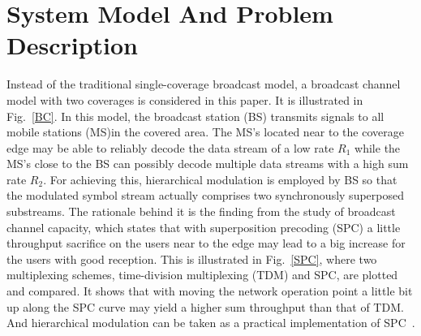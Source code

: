 \documentclass[conference]{IEEEtran}
\begin{document}
\section{System Model And Problem Description}
\begin{figure}
\end{figure}
Instead of the traditional single-coverage broadcast model, a
broadcast channel model with two coverages is considered in this
paper. It is illustrated in Fig.~\ref{BC}. In this model, the
broadcast station (BS) transmits signals to all mobile stations
(MS)in the covered area. The MS's located near to the coverage
edge may be able to reliably decode the data stream of a low rate
$R_1$ while the MS's close to the BS can possibly decode multiple
data streams with a high sum rate $R_2$. For achieving this,
hierarchical modulation is employed by BS so that the modulated
symbol stream actually comprises two synchronously superposed
substreams. The rationale behind it is the finding from the study
of broadcast channel capacity, which states that with
superposition precoding (SPC) a little throughput sacrifice on the
users near to the edge may lead to a big increase for the users
with good reception. This is illustrated in Fig.~\ref{SPC}, where
two multiplexing schemes, time-division multiplexing (TDM) and
SPC, are plotted and compared. It shows that with moving the
network operation point a little bit up along the SPC curve may
yield a higher sum throughput than that of TDM. And hierarchical
modulation can be taken as a practical implementation of
SPC~\cite{Cover72}.
\begin{figure}
\end{figure}
\end{document}

